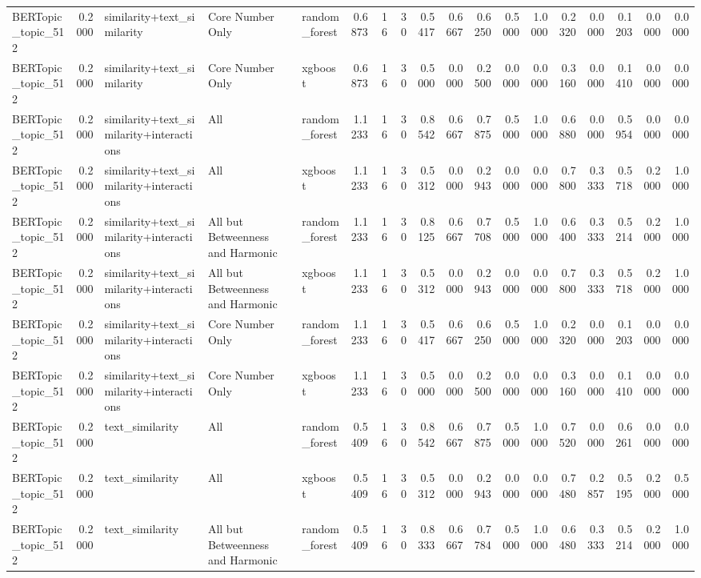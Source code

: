 \begin{tabular}{lrlllrrrrrrrrrrrrr}
BERTopic_topic_512 & 0.2000 & similarity+text_similarity & Core Number Only & random_forest & 0.6873 & 16 & 30 & 0.5417 & 0.6667 & 0.6250 & 0.5000 & 1.0000 & 0.2320 & 0.0000 & 0.1203 & 0.0000 & 0.0000 \\
BERTopic_topic_512 & 0.2000 & similarity+text_similarity & Core Number Only & xgboost & 0.6873 & 16 & 30 & 0.5000 & 0.0000 & 0.2500 & 0.0000 & 0.0000 & 0.3160 & 0.0000 & 0.1410 & 0.0000 & 0.0000 \\
BERTopic_topic_512 & 0.2000 & similarity+text_similarity+interactions & All & random_forest & 1.1233 & 16 & 30 & 0.8542 & 0.6667 & 0.7875 & 0.5000 & 1.0000 & 0.6880 & 0.0000 & 0.5954 & 0.0000 & 0.0000 \\
BERTopic_topic_512 & 0.2000 & similarity+text_similarity+interactions & All & xgboost & 1.1233 & 16 & 30 & 0.5312 & 0.0000 & 0.2943 & 0.0000 & 0.0000 & 0.7800 & 0.3333 & 0.5718 & 0.2000 & 1.0000 \\
BERTopic_topic_512 & 0.2000 & similarity+text_similarity+interactions & All but Betweenness and Harmonic & random_forest & 1.1233 & 16 & 30 & 0.8125 & 0.6667 & 0.7708 & 0.5000 & 1.0000 & 0.6400 & 0.3333 & 0.5214 & 0.2000 & 1.0000 \\
BERTopic_topic_512 & 0.2000 & similarity+text_similarity+interactions & All but Betweenness and Harmonic & xgboost & 1.1233 & 16 & 30 & 0.5312 & 0.0000 & 0.2943 & 0.0000 & 0.0000 & 0.7800 & 0.3333 & 0.5718 & 0.2000 & 1.0000 \\
BERTopic_topic_512 & 0.2000 & similarity+text_similarity+interactions & Core Number Only & random_forest & 1.1233 & 16 & 30 & 0.5417 & 0.6667 & 0.6250 & 0.5000 & 1.0000 & 0.2320 & 0.0000 & 0.1203 & 0.0000 & 0.0000 \\
BERTopic_topic_512 & 0.2000 & similarity+text_similarity+interactions & Core Number Only & xgboost & 1.1233 & 16 & 30 & 0.5000 & 0.0000 & 0.2500 & 0.0000 & 0.0000 & 0.3160 & 0.0000 & 0.1410 & 0.0000 & 0.0000 \\
BERTopic_topic_512 & 0.2000 & text_similarity & All & random_forest & 0.5409 & 16 & 30 & 0.8542 & 0.6667 & 0.7875 & 0.5000 & 1.0000 & 0.7520 & 0.0000 & 0.6261 & 0.0000 & 0.0000 \\
BERTopic_topic_512 & 0.2000 & text_similarity & All & xgboost & 0.5409 & 16 & 30 & 0.5312 & 0.0000 & 0.2943 & 0.0000 & 0.0000 & 0.7480 & 0.2857 & 0.5195 & 0.2000 & 0.5000 \\
BERTopic_topic_512 & 0.2000 & text_similarity & All but Betweenness and Harmonic & random_forest & 0.5409 & 16 & 30 & 0.8333 & 0.6667 & 0.7784 & 0.5000 & 1.0000 & 0.6480 & 0.3333 & 0.5214 & 0.2000 & 1.0000 \\

\end{tabular}
